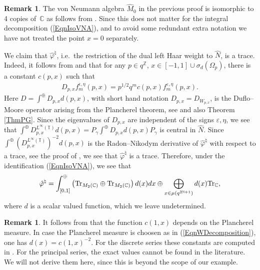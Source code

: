 \documentclass[pdftex]{sigma}
\numberwithin{equation}{section}
\theoremstyle{definition}
\newtheorem{rmk}[thm]{Remark}
\newcommand{\ep}{\varepsilon}
\begin{document}
\begin{rmk}
The von Neumann algebra $\hat{M}_0$ in the previous proof is isomorphic to 4 copies of~$\mathbb{C}$ as follows from \cite[Proposition 10.13]{GroKoeKus}. Since this does not matter for the integral decomposition (\ref{EqnIsoVNA}), and to avoid some redundant extra notation we have not treated the point $x =0$ separately.
\end{rmk}

We claim that $\hat{\varphi}^\natural$, i.e.\ the restriction of the dual left Haar weight to $\hat{N}$, is a trace. Indeed, it follows from \cite[Section 5]{CasKoe} and \cite[Proposition 3.5.5]{Des} that for any $p \in q^{\mathbb{Z}}$, $x \in [-1,1] \cup \sigma_d(\Omega_p)$, there is a constant $c(p,x)$ such that
\begin{gather*}%
D_{p,x} f_{m}^{\epsilon, \eta}(p,x) = p^{1/2} q^m c(p,x) f_m^{\ep, \eta}(p,x).
\end{gather*}
Here $D = \int^\oplus D_{p,x} d(p,x)$, with short hand notation $D_{p,x} = D_{W_{p,x}}$, is the Duf\/lo--Moore operator arising from the Plancherel theorem, see \cite[Theorem 3.4.1]{Des} and also Theorem \ref{ThmPG}.
Since the eigenvalues of $D_{p,x}$ are independent of the signs $\ep, \eta$, we see that $\int^\oplus D_{p,x}^{L^\infty(\mathbb{T})} d(p,x) = P_\gamma \int^\oplus D_{p,x}  d(p,x) P_\gamma$ is central in $\hat{N}$.
Since $\int^\oplus (D_{p,x}^{L^\infty(\mathbb{T})} )^{-2} d(p,x)$ is the Radon--Nikodym derivative of $\hat{\varphi}^\natural$ with respect to a trace, see the proof of \cite[Theorem 3.4.5]{Des}, we see that $\hat{\varphi}^\natural$ is a trace. Therefore, under the identif\/ication (\ref{EqnIsoVNA}), we see that
\begin{gather}\label{EqnDualWeight}
 \hat{\varphi}^\natural = \int^\oplus_{[0,1]} \left( {\rm Tr}_{M_2(\mathbb{C})} \oplus  {\rm Tr}_{M_2(\mathbb{C})}  \right) d(x)  dx \oplus  \bigoplus_{x \in \mu(q^{2\mathbb{N}+1})} d(x) {\rm Tr}_{\mathbb{C}},
\end{gather}
where $d$ is a scalar valued function, which we leave undetermined.
\begin{rmk}
It follows from \cite[Theorem 3.4.1 (6)]{Des} that the function $c(1,x)$ depends on the Plancherel measure. In case the Plancherel measure is choosen as in (\ref{EqnWDecomposition}), one has $d(x) = c(1,x)^{-2}$. For the discrete series these constants are computed in \cite[Section 3.5]{Des}. For the principal series, the exact values cannot be found in the literature. We will not derive them here, since this is beyond the scope of our example.
\end{rmk}
\end{document}
